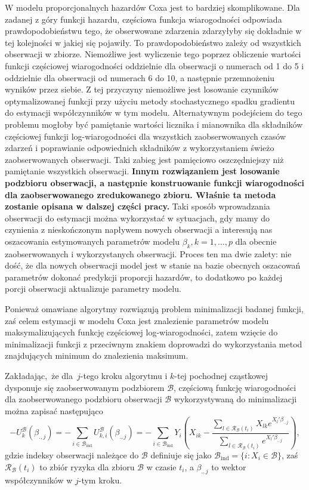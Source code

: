 W modelu proporcjonalnych hazardów Coxa jest to bardziej skomplikowane. Dla zadanej z góry funkcji hazardu, częściowa funkcja wiarogodności odpowiada prawdopodobieństwu tego, że obserwowane zdarzenia zdarzyłyby się dokładnie w tej kolejności w jakiej się pojawiły. To prawdopodobieństwo zależy od wszystkich obserwacji w zbiorze. Niemożliwe jest wyliczenie tego poprzez obliczenie wartości funkcji częściowej wiarogodności oddzielnie dla obserwacji o numerach od 1 do 5 i oddzielnie dla obserwacji od numerach 6 do 10, a następnie przemnożeniu wyników przez siebie. Z tej przyczyny niemożliwe jest losowanie czynników optymalizowanej funkcji przy użyciu metody stochastycznego spadku gradientu do estymacji współczynników w tym modelu. Alternatywnym podejściem do tego problemu mogłoby być pamiętanie wartości licznika i mianownika dla składników częściowej funkcji log-wiarogodności dla wszystkich zaobserwowanych czasów zdarzeń i poprawianie odpowiednich składników z wykorzystaniem świeżo zaobserwowanych obserwacji. Taki zabieg jest pamięciowo oszczędniejszy niż pamiętanie wszystkich obserwacji. \textbf{Innym rozwiązaniem jest losowanie podzbioru obserwacji, a następnie konstruowanie funkcji wiarogodności dla zaobserwowanego zredukowanego zbioru. Właśnie ta metoda zostanie opisana w dalszej części pracy.} Taki sposób wprowadzania obserwacji do estymacji można wykorzystać w sytuacjach, gdy mamy do czynienia z nieskończonym napływem nowych obserwacji a interesują nas oszacowania estymowanych parametrów modelu $\beta_k, k=1,\dots,p$ dla obecnie zaobserwowanych i wykorzystanych obserwacji. Proces ten ma dwie zalety: nie dość, że dla nowych obserwacji model jest w stanie na bazie obecnych oszacowań parametrów dokonać predykcji proporcji hazardów, to dodatkowo po każdej porcji obserwacji aktualizuje parametry modelu.

Ponieważ
omawiane algorytmy rozwiązują problem minimalizacji badanej funkcji, zaś
celem estymacji w modelu Coxa jest znalezienie parametrów modelu
maksymalizujących funkcję częściowej log-wiarogodności, zatem wzięcie do
minimalizacji funkcji z przeciwnym znakiem doprowadzi do wykorzystania
metod znajdujących minimum do znalezienia maksimum. 

Zakładając,~że dla~\(j\)-tego kroku
algorytmu i \(k\)-tej pochodnej cząstkowej dysponuje się zaobserwowanym podzbiorem
\(\mathcal{B}\), częściową funkcję wiarogodności dla zaobserwowanego podzbioru obserwacji \(\mathcal{B}\) wykorzystywaną do minimalizacji można zapisać następująco
\begin{equation}
-U^\mathcal{B}_k(\beta_{.,j})=-\sum\limits_{i \in \mathcal{B}_\text{ind}}^{}U^\mathcal{B}_{k,i}(\beta_{.,j})=-\sum\limits_{i \in \mathcal{B}_\text{ind}}^{}Y_i\left(X_{ik}-\dfrac{\sum\limits_{l\in \mathscr{R}_\mathcal{B}(t_i)}^{} X_{lk} e^{X_l'\beta_{.,j}}}{\sum\limits_{l\in \mathscr{R}_\mathcal{B}(t_i)}^{} e^{X_l'\beta_{.,j}}}\right),
\end{equation}
gdzie indeksy obserwacji należące do \(\mathcal{B}\) definiuje się jako
\(\mathcal{B}_{\text{ind}} = \{i: X_i \in \mathcal{B} \}\), zaś
\(\mathscr{R}_\mathcal{B}(t_i)\) to zbiór ryzyka dla zbioru
\(\mathcal{B}\) w czasie \(t_i\), a $\beta_{.,j}$ to wektor współczynników w $j$-tym kroku.

